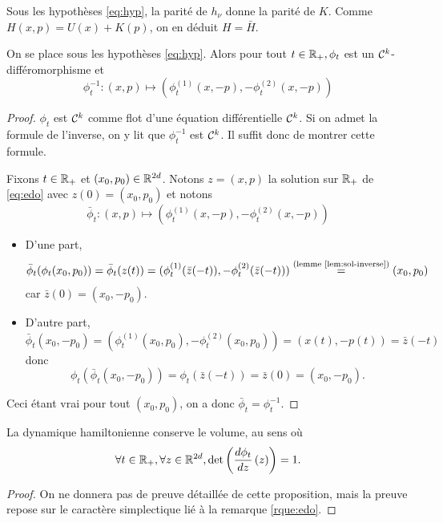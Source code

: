 \documentclass[10pt,a4paper]{article}
\begin{document}
\begin{Rque}\label{rque:Hbar}
	Sous les hypothèses \eqref{eq:hyp}, la parité de $h_\nu$ donne la parité de $K$. Comme $H(x,p) = U(x)+K(p)$, on en déduit $H = \bar H$.
\end{Rque}

\begin{Prop}[réversibilité]\label{prop:rev}
	On se place sous les hypothèses \eqref{eq:hyp}. Alors pour tout $t \in \mathbb{R}_+, \phi_t$ est un $\mathcal{C}^k$-différomorphisme et
	$$
	\phi_t^{-1} : (x,p) \mapsto (\phi_t^{(1)}(x, -p), - \phi_t^{(2)}(x, -p))
	$$
\end{Prop}
\begin{proof}
	$\phi_t$ est $\mathcal{C}^k$ comme flot d'une équation différentielle $\mathcal{C}^k$. Si on admet la formule de l'inverse, on y lit que $\phi_t^{-1}$ est $\mathcal{C}^k$. Il suffit donc de montrer cette formule.

	Fixons $t \in \mathbb{R}_+$ et $(x_0,p_0) \in \mathbb{R}^{2d}$. Notons $z=(x,p)$ la solution sur $\mathbb{R}_+$ de \eqref{eq:edo} avec $z(0) = (x_0,p_0)$ et notons
	$$
	\bar \phi_t : (x,p) \mapsto (\phi_t^{(1)}(x, -p), - \phi_t^{(2)}(x, -p))
	$$
        \begin{itemize}
		\item D'une part,
		$$
		\bar \phi_t(\phi_t(x_0,p_0)) = \bar \phi_t(z(t)) = (\phi_t^{(1)}(\bar z(-t)), - \phi_t^{(2)}(\bar z(-t))) \overset{\text{(lemme \ref{lem:sol-inverse})}}{=} (x_0, p_0)
		$$
		car $\bar z(0) = (x_0,-p_0)$.

		\item D'autre part,
		$$
		\bar \phi_t(x_0,-p_0) = (\phi_t^{(1)}(x_0, p_0), - \phi_t^{(2)}(x_0, p_0)) = (x(t),-p(t)) = \bar z(-t)
		$$
		donc
		$$
		\phi_t (\bar \phi_t(x_0,-p_0)) = \phi_t(\bar z(-t)) = \bar{z}(0) = (x_0,-p_0).
		$$
	\end{itemize}
	Ceci étant vrai pour tout $(x_0,p_0)$, on a donc $\bar \phi_t = \phi_t^{-1}$.
\end{proof}


\begin{Prop}\label{prop:vol}
	La dynamique hamiltonienne conserve le volume, au sens où
	$$
	\forall t \in \mathbb{R}_+, \forall z \in \mathbb{R}^{2d}, \det \left( \frac{d \phi_t}{d z} \left( z \right) \right) = 1.
	$$
\end{Prop}
\begin{proof}
On ne donnera pas de preuve détaillée de cette proposition, mais la preuve repose sur le caractère simplectique lié à la remarque \ref{rque:edo}.
\end{proof}
\end{document}
